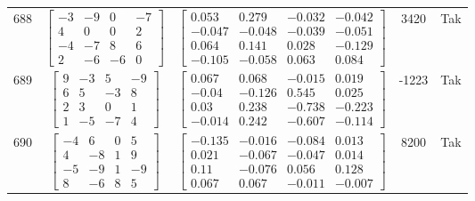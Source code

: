 \documentclass[a4paper,12pt]{article}
\begin{document}
\begin{tabular}{c c c c c}
688
&
$\begin{bmatrix} -3 & -9 & 0 & -7 \\ 4 & 0 & 0 & 2 \\ -4 & -7 & 8 & 6 \\ 2 & -6 & -6 & 0 \end{bmatrix}$
&
$\begin{bmatrix} 0.053 & 0.279 & -0.032 & -0.042 \\ -0.047 & -0.048 & -0.039 & -0.051 \\ 0.064 & 0.141 & 0.028 & -0.129 \\ -0.105 & -0.058 & 0.063 & 0.084 \end{bmatrix}$
&
3420
&
Tak
\\
689
&
$\begin{bmatrix} 9 & -3 & 5 & -9 \\ 6 & 5 & -3 & 8 \\ 2 & 3 & 0 & 1 \\ 1 & -5 & -7 & 4 \end{bmatrix}$
&
$\begin{bmatrix} 0.067 & 0.068 & -0.015 & 0.019 \\ -0.04 & -0.126 & 0.545 & 0.025 \\ 0.03 & 0.238 & -0.738 & -0.223 \\ -0.014 & 0.242 & -0.607 & -0.114 \end{bmatrix}$
&
-1223
&
Tak
\\
690
&
$\begin{bmatrix} -4 & 6 & 0 & 5 \\ 4 & -8 & 1 & 9 \\ -5 & -9 & 1 & -9 \\ 8 & -6 & 8 & 5 \end{bmatrix}$
&
$\begin{bmatrix} -0.135 & -0.016 & -0.084 & 0.013 \\ 0.021 & -0.067 & -0.047 & 0.014 \\ 0.11 & -0.076 & 0.056 & 0.128 \\ 0.067 & 0.067 & -0.011 & -0.007 \end{bmatrix}$
&
8200
&
Tak
\\
\end{tabular} \egroup \newpage
\end{document}

